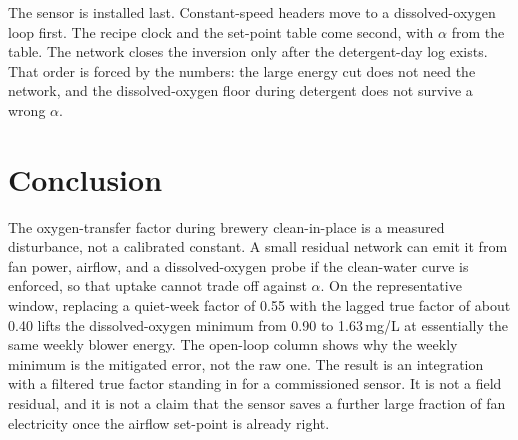 \documentclass[11pt,a4paper]{article}
\begin{document}
The sensor is installed last. Constant-speed headers move to a dissolved-oxygen loop first. The recipe clock and the set-point table come second, with \(\alpha\) from the table. The network closes the inversion only after the detergent-day log exists. That order is forced by the numbers: the large energy cut does not need the network, and the dissolved-oxygen floor during detergent does not survive a wrong \(\alpha\).

\section{Conclusion}

The oxygen-transfer factor during brewery clean-in-place is a measured disturbance, not a calibrated constant. A small residual network can emit it from fan power, airflow, and a dissolved-oxygen probe if the clean-water curve is enforced, so that uptake cannot trade off against \(\alpha\). On the representative window, replacing a quiet-week factor of 0.55 with the lagged true factor of about 0.40 lifts the dissolved-oxygen minimum from 0.90 to 1.63\,mg/L at essentially the same weekly blower energy. The open-loop column shows why the weekly minimum is the mitigated error, not the raw one. The result is an integration with a filtered true factor standing in for a commissioned sensor. It is not a field residual, and it is not a claim that the sensor saves a further large fraction of fan electricity once the airflow set-point is already right.
\end{document}
